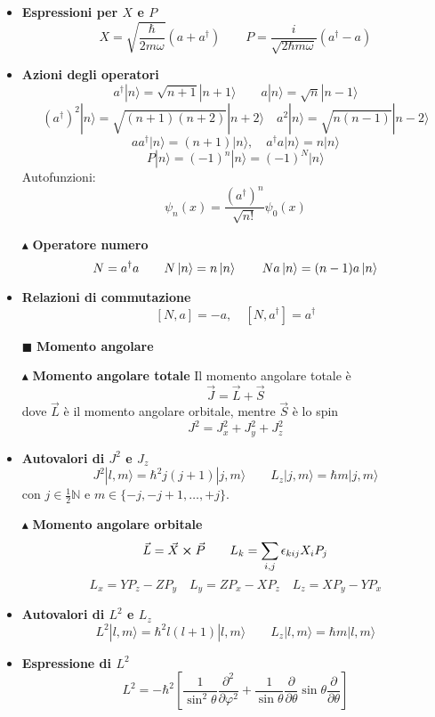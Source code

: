 \documentclass{book}
\newcommand{\g}{\textbf}
\newcommand{\e}{\begin{equation}}
\newcommand{\ex}{\end{equation} }
\renewcommand{\it}{\item[$\cdot$]}
\begin{document}
\begin{multicols}{4}
\begin{itemize}
    \it \g{Espressioni per $X$ e $P$}
        \e{X = \sqrt{\frac{\hbar}{2m\omega}} (a + a^\dagger) \qquad P = \frac{i}{\sqrt{2\hbar m \omega}} (a^\dagger - a)} \ex

    \it \g{Azioni degli operatori}
        \e{a^\dagger |n\rangle = \sqrt{n + 1} |n + 1\rangle \qquad a |n\rangle = \sqrt{n} |n - 1\rangle} \ex
        \e{(a^\dagger)^2 |n\rangle = \sqrt{(n + 1)(n + 2)} |n + 2\rangle \quad a^2 |n\rangle = \sqrt{n(n - 1)} |n - 2\rangle} \ex
        \e{a a^\dagger |n\rangle = (n + 1) |n\rangle, \quad a^\dagger a |n\rangle = n |n\rangle} \ex
        \e{P |n\rangle = (-1)^n |n\rangle = (-1)^N |n\rangle} \ex
        Autofunzioni:
        \e{\psi_n(x) = \frac{(a^\dagger)^n}{\sqrt{n!}} \psi_0(x)} \ex
\item [$\blacktriangle$] \g{Operatore numero}
        \e{N = a^\dagger a \qquad N\ket{n} = n\ket{n} \qquad N a \ket{n} = (n-1)a\ket{n}}\ex
    \it \g{Relazioni di commutazione}
        \e{[N, a] = -a, \quad [N, a^\dagger] = a^\dagger} \ex
    
\item [$\blacksquare$] \g{Momento angolare}
\item [$\blacktriangle$] \g{Momento angolare totale}
        Il momento angolare totale è
        \e{\vec{J} = \vec{L} + \vec{S}}\ex
            dove $\vec{L}$ è il momento angolare orbitale, mentre $\vec{S}$ è lo spin
        \e{{J}^{2} = J^{2}_{x} + J^{2}_{y} + J^{2}_{z}}\ex
         \it \g{Autovalori di $J^2$ e $J_z$}
    \e{J^2 |l, m\rangle = \hbar^2 j(j + 1) |j, m\rangle \qquad L_z |j, m\rangle = \hbar m |j, m\rangle} \ex
      con $j \in \frac{1}{2} \mathbb{N}$ e $m \in \{-j, -j + 1, \dots, +j\}$.
    \item [$\blacktriangle$] \g{Momento angolare orbitale}
        \e{\vec{L} = \vec{X} \cross \vec{P} \qquad L_k = \sum_{i,j}\epsilon_{kij} X_i P_j} \ex
    \e{L_{x} = YP_{z} - ZP_{y} \quad L_{y} = ZP_{x} - XP_{z} \quad L_{z} = XP_{y} - YP_{x}}\ex
    \it \g{Autovalori di $L^2$ e $L_z$}
    \e{L^2 |l, m\rangle = \hbar^2 l(l + 1) |l, m\rangle \qquad L_z |l, m\rangle = \hbar m |l, m\rangle} \ex

    \it \g{Espressione di $L^2$}
    \e{L^2 = -\hbar^2 \left[\frac{1}{\sin^2\theta} \frac{\partial^2}{\partial \varphi^2} + \frac{1}{\sin\theta} \frac{\partial}{\partial \theta} \sin\theta \frac{\partial}{\partial \theta}\right]} \ex


\end{itemize}
\end{multicols}
\end{document}
